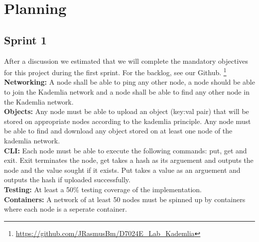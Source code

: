 \section{Planning}\label{sec:planning}

\subsection{Sprint 1}\label{sec:sprint-1}

After a discussion we estimated that we will complete the mandatory objectives 
for this project during the first sprint. For the backlog, see our Github.
\footnote{\href{https://github.com/JRasmusBm/D7024E_Lab_Kademlia}{https://github.com/JRasmusBm/D7024E\_Lab\_Kademlia}}\\

\textbf{Networking:} A node shall be able to ping any other node, a node should be able to join the Kademlia network and a node shall be able to find any other node in the Kademlia network.\\

\textbf{Objects:} Any node must be able to upload an object (key:val pair) that will be stored on appropriate nodes according to the kademlia principle. Any node must be able to find and download any object stored on at least one node of the kademlia network.\\

\textbf{CLI:} Each node must be able to execute the following commands: put, get and exit. Exit terminates the node, get takes a hash as its arguement and outputs the node and the value sought if it exists. Put takes a value as an arguement and outputs the hash if uploaded successfully.\\

\textbf{Testing:} At least a 50\% testing coverage of the implementation.\\

\textbf{Containers:} A network of at least 50 nodes must be spinned up by containers where each node is a seperate container.\\

